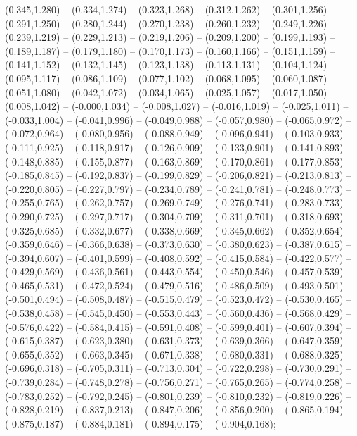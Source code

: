 (0.345,1.280) -- (0.334,1.274) -- (0.323,1.268) -- (0.312,1.262) -- (0.301,1.256) -- (0.291,1.250) -- (0.280,1.244) -- (0.270,1.238) -- (0.260,1.232) -- (0.249,1.226) -- (0.239,1.219) -- (0.229,1.213) -- (0.219,1.206) -- (0.209,1.200) -- (0.199,1.193) -- (0.189,1.187) -- (0.179,1.180) -- (0.170,1.173) -- (0.160,1.166) -- (0.151,1.159) -- (0.141,1.152) -- (0.132,1.145) -- (0.123,1.138) -- (0.113,1.131) -- (0.104,1.124) -- (0.095,1.117) -- (0.086,1.109) -- (0.077,1.102) -- (0.068,1.095) -- (0.060,1.087) -- (0.051,1.080) -- (0.042,1.072) -- (0.034,1.065) -- (0.025,1.057) -- (0.017,1.050) -- (0.008,1.042) -- (-0.000,1.034) -- (-0.008,1.027) -- (-0.016,1.019) -- (-0.025,1.011) -- (-0.033,1.004) -- (-0.041,0.996) -- (-0.049,0.988) -- (-0.057,0.980) -- (-0.065,0.972) -- (-0.072,0.964) -- (-0.080,0.956) -- (-0.088,0.949) -- (-0.096,0.941) -- (-0.103,0.933) -- (-0.111,0.925) -- (-0.118,0.917) -- (-0.126,0.909) -- (-0.133,0.901) -- (-0.141,0.893) -- (-0.148,0.885) -- (-0.155,0.877) -- (-0.163,0.869) -- (-0.170,0.861) -- (-0.177,0.853) -- (-0.185,0.845) -- (-0.192,0.837) -- (-0.199,0.829) -- (-0.206,0.821) -- (-0.213,0.813) -- (-0.220,0.805) -- (-0.227,0.797) -- (-0.234,0.789) -- (-0.241,0.781) -- (-0.248,0.773) -- (-0.255,0.765) -- (-0.262,0.757) -- (-0.269,0.749) -- (-0.276,0.741) -- (-0.283,0.733) -- (-0.290,0.725) -- (-0.297,0.717) -- (-0.304,0.709) -- (-0.311,0.701) -- (-0.318,0.693) -- (-0.325,0.685) -- (-0.332,0.677) -- (-0.338,0.669) -- (-0.345,0.662) -- (-0.352,0.654) -- (-0.359,0.646) -- (-0.366,0.638) -- (-0.373,0.630) -- (-0.380,0.623) -- (-0.387,0.615) -- (-0.394,0.607) -- (-0.401,0.599) -- (-0.408,0.592) -- (-0.415,0.584) -- (-0.422,0.577) -- (-0.429,0.569) -- (-0.436,0.561) -- (-0.443,0.554) -- (-0.450,0.546) -- (-0.457,0.539) -- (-0.465,0.531) -- (-0.472,0.524) -- (-0.479,0.516) -- (-0.486,0.509) -- (-0.493,0.501) -- (-0.501,0.494) -- (-0.508,0.487) -- (-0.515,0.479) -- (-0.523,0.472) -- (-0.530,0.465) -- (-0.538,0.458) -- (-0.545,0.450) -- (-0.553,0.443) -- (-0.560,0.436) -- (-0.568,0.429) -- (-0.576,0.422) -- (-0.584,0.415) -- (-0.591,0.408) -- (-0.599,0.401) -- (-0.607,0.394) -- (-0.615,0.387) -- (-0.623,0.380) -- (-0.631,0.373) -- (-0.639,0.366) -- (-0.647,0.359) -- (-0.655,0.352) -- (-0.663,0.345) -- (-0.671,0.338) -- (-0.680,0.331) -- (-0.688,0.325) -- (-0.696,0.318) -- (-0.705,0.311) -- (-0.713,0.304) -- (-0.722,0.298) -- (-0.730,0.291) -- (-0.739,0.284) -- (-0.748,0.278) -- (-0.756,0.271) -- (-0.765,0.265) -- (-0.774,0.258) -- (-0.783,0.252) -- (-0.792,0.245) -- (-0.801,0.239) -- (-0.810,0.232) -- (-0.819,0.226) -- (-0.828,0.219) -- (-0.837,0.213) -- (-0.847,0.206) -- (-0.856,0.200) -- (-0.865,0.194) -- (-0.875,0.187) -- (-0.884,0.181) -- (-0.894,0.175) -- (-0.904,0.168);

